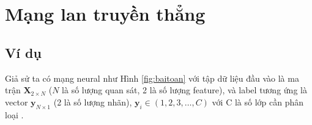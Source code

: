 \section{Mạng lan truyền thẳng}
\label{sec:forward}
%
\subsection{Ví dụ}
Giả sử ta có mạng neural như Hình \ref{fig:baitoan} với tập dữ liệu đầu vào là ma trận $\textbf{X}_{2{\times}N}$ ($N$ là số lượng quan sát, 2 là số lượng feature), và label tương ứng là vector $\textbf{y}_{N\times 1}$ (2 là số lượng nhãn), $\textbf{y}_i \in (1,2,3,\ldots,C)$ với C là số lớp cần phân loại .

